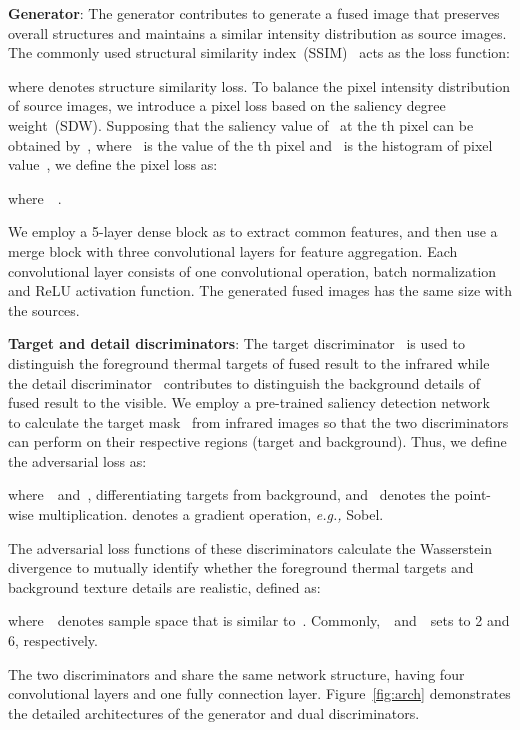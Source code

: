 \documentclass[10pt,twocolumn,letterpaper]{article}
\begin{document}
\textbf{Generator}: The generator contributes to generate a fused image that preserves overall structures and  maintains a similar intensity distribution as source images. The commonly used structural similarity index~(SSIM)~\cite{wang2004image} acts as the loss function: 
\vspace{-0.2cm} 

where  denotes structure similarity loss. To balance the pixel intensity distribution of source images, we introduce a pixel loss based on the saliency degree weight~(SDW). Supposing that the saliency value of~ at the th pixel can be obtained by~, where~ is the value of the th pixel and~ is the histogram  of pixel value~, we define the pixel loss  as:

where~~.

We employ a 5-layer dense block\cite{huang2019convolutional} as  to extract common features, and then use a merge block with three convolutional layers for feature aggregation. Each convolutional layer consists of one convolutional operation, batch normalization and ReLU activation function. The generated fused images  has the same size with the sources. 

\textbf{Target and detail discriminators}: The target discriminator~ is used to distinguish the foreground thermal targets of fused result to the infrared while the detail discriminator~ contributes to distinguish the background details of fused result to the visible. We employ a pre-trained saliency detection network~\cite{deng2018r3net} to calculate the target mask~ from infrared images so that the two discriminators can perform on their respective regions (target and background). Thus, we define the adversarial loss  as:
\vspace{-0.1cm} 



where~~and~, differentiating targets from background, and ~denotes
the point-wise multiplication.  denotes a gradient operation, \emph{e.g.,} Sobel.

The adversarial loss functions of these discriminators calculate the Wasserstein divergence to mutually identify whether the foreground thermal targets and background texture details are realistic, defined as:
\vspace{-0.3cm} 


where~~denotes sample space that is similar to~. Commonly,~~and~~sets to 2 and 6, respectively.

The two discriminators  and  share the same network structure, having four convolutional layers and one fully connection layer. Figure~\ref{fig:arch} demonstrates the detailed architectures of the generator and dual discriminators.
\end{document}
